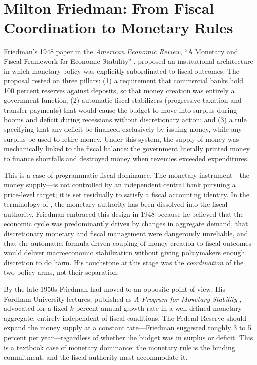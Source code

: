 \documentclass[12pt]{article}
\begin{document}
\section{Milton Friedman: From Fiscal Coordination to Monetary Rules}

Friedman's 1948 paper in the \textit{American Economic Review},
``A Monetary and Fiscal Framework for Economic Stability''
\citep{Friedman1948}, proposed an institutional architecture in which
monetary policy was explicitly subordinated to fiscal outcomes.  The
proposal rested on three pillars: (1) a requirement that commercial banks
hold 100 percent reserves against deposits, so that money creation was
entirely a government function; (2) automatic fiscal stabilizers
(progressive taxation and transfer payments) that would cause the budget
to move into surplus during booms and deficit during recessions without
discretionary action; and (3) a rule specifying that any deficit be
financed exclusively by issuing money, while any surplus be used to
retire money.  Under this system, the supply of money was mechanically
linked to the fiscal balance: the government literally printed money
to finance shortfalls and destroyed money when revenues exceeded
expenditures.

This is a case of programmatic fiscal dominance.  The monetary
instrument---the money supply---is not controlled by an independent
central bank pursuing a price-level target; it is set residually to
satisfy a fiscal accounting identity.  In the terminology of
\citet{Sargent2011}, the monetary authority has been dissolved into
the fiscal authority.  Friedman embraced this design in 1948 because he
believed that the economic cycle was predominantly driven by changes in
aggregate demand, that discretionary monetary and fiscal management were
dangerously unreliable, and that the automatic, formula-driven coupling
of money creation to fiscal outcomes would deliver macroeconomic
stabilization without giving policymakers enough discretion to do harm.
His touchstone at this stage was the \textit{coordination} of the two
policy arms, not their separation.

By the late 1950s Friedman had moved to an opposite point of view.  His Fordham University
lectures, published as \textit{A Program for Monetary Stability}
\citep{Friedman1960}, advocated for a fixed $k$-percent annual growth
rate in a well-defined monetary aggregate, entirely independent of
fiscal conditions.  The Federal Reserve should expand the money supply
at a constant rate---Friedman suggested roughly 3 to 5 percent per
year---regardless of whether the budget was in surplus or deficit.
This is a textbook case of monetary dominance: the monetary rule is the
binding commitment, and the fiscal authority must accommodate it.
\end{document}
